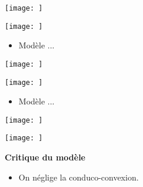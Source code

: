 \documentclass[a4paper,12pt]{article}
\begin{document}
\begin{center}
  \texttt{[image: ]}
  \end{center}
\begin{center}
  \texttt{[image: ]}
  \end{center}
\begin{itemize}
    \item Modèle ...
\end{itemize}


\begin{center}
  \texttt{[image: ]}
  \end{center}
\begin{center}
  \texttt{[image: ]}
  \end{center}
\begin{itemize}
    \item Modèle ...
\end{itemize}

\begin{center}
  \texttt{[image: ]}
  \end{center}
\begin{center}
  \texttt{[image: ]}
  \end{center}
\vspace{1cm}


\textbf{Critique du modèle}
\vspace{1cm}
\begin{itemize}
    \item On néglige la conduco-convexion.
\end{itemize}
\end{document}
